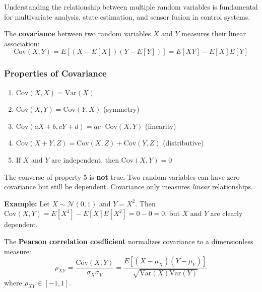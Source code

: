 Understanding the relationship between multiple random variables is fundamental for multivariate analysis, state estimation, and sensor fusion in control systems.

\begin{definitionbox}[title=Definition: Covariance]
The \textbf{covariance} between two random variables $X$ and $Y$ measures their linear association:
\begin{equation}
\text{Cov}(X, Y) = E[(X - E[X])(Y - E[Y])] = E[XY] - E[X]E[Y]
\end{equation}
\end{definitionbox}

\subsubsection{Properties of Covariance}
\begin{enumerate}
    \item $\text{Cov}(X, X) = \text{Var}(X)$
    \item $\text{Cov}(X, Y) = \text{Cov}(Y, X)$ (symmetry)
    \item $\text{Cov}(aX + b, cY + d) = ac \cdot \text{Cov}(X, Y)$ (linearity)
    \item $\text{Cov}(X + Y, Z) = \text{Cov}(X, Z) + \text{Cov}(Y, Z)$ (distributive)
    \item If $X$ and $Y$ are independent, then $\text{Cov}(X, Y) = 0$
\end{enumerate}

\begin{warningbox}[title=Covariance Zero Does Not Imply Independence]
The converse of property 5 is \textbf{not} true. Two random variables can have zero covariance but still be dependent. Covariance only measures \textit{linear} relationships.

\textbf{Example:} Let $X \sim \mathcal{N}(0,1)$ and $Y = X^2$. Then $\text{Cov}(X, Y) = E[X^3] - E[X]E[X^2] = 0 - 0 = 0$, but $X$ and $Y$ are clearly dependent.
\end{warningbox}

\begin{definitionbox}[title=Definition: Correlation Coefficient]
The \textbf{Pearson correlation coefficient} normalizes covariance to a dimensionless measure:
\begin{equation}
\rho_{XY} = \frac{\text{Cov}(X, Y)}{\sigma_X \sigma_Y} = \frac{E[(X-\mu_X)(Y-\mu_Y)]}{\sqrt{\text{Var}(X)\text{Var}(Y)}}
\end{equation}
where $\rho_{XY} \in [-1, 1]$.
\end{definitionbox}

